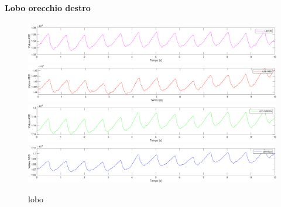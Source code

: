 \paragraph{Lobo orecchio destro}
\begin{figure}[h]
	\centering
	\includegraphics[width=1\linewidth]{ImageFiles/Misure Preliminari/Soggetto 1/lobo_ired}
	\includegraphics[width=1\linewidth]{ImageFiles/Misure Preliminari/Soggetto 1/lobo_red}
	\includegraphics[width=1\linewidth]{ImageFiles/Misure Preliminari/Soggetto 1/lobo_green}
	\includegraphics[width=1\linewidth]{ImageFiles/Misure Preliminari/Soggetto 1/lobo_blu}
	\caption{lobo}
	\label{fig:Descrizione_Segnale_PPG}
\end{figure}

